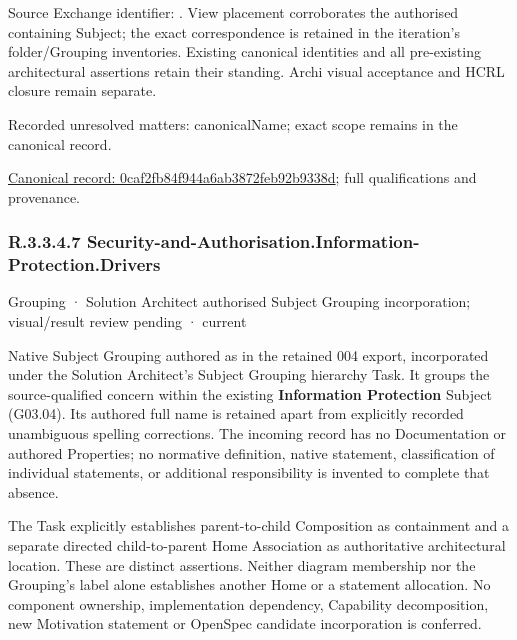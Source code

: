 Source Exchange identifier: \texttt{}. View placement corroborates
the authorised containing Subject; the exact correspondence is retained in the
iteration's folder/Grouping inventories. Existing canonical identities and all
pre-existing architectural assertions retain their standing. Archi visual
acceptance and HCRL closure remain separate.


{\small Recorded unresolved matters: canonicalName; exact scope remains in the canonical record.}\par
{\footnotesize \href{../../../../continuum/grouping/0caf2fb84f944a6ab3872feb92b9338d.md}{Canonical record: 0caf2fb84f944a6ab3872feb92b9338d}; full qualifications and provenance.}\par
\subsubsection*{R.3.3.4.7 Security-and-Authorisation.Information-Protection.Drivers}
\label{navigation:R.3.3.4.7}

\label{element:ce45a338a1fc4d11a8d64ce898119f94}
{\small Grouping · Solution Architect authorised Subject Grouping incorporation; visual/result review pending · current}\par

Native Subject Grouping authored as \texttt{} in the retained 004 export,
incorporated under the Solution Architect's Subject Grouping hierarchy Task.
It groups the source-qualified \texttt{} concern within
the existing \textbf{Information Protection} Subject (G03.04). Its authored full name
is retained apart from explicitly recorded unambiguous spelling corrections.
The incoming record has no Documentation or authored Properties; no normative
definition, native statement, classification of individual statements, or
additional responsibility is invented to complete that absence.



The Task explicitly establishes parent-to-child Composition as containment and
a separate directed child-to-parent Home Association as authoritative architectural
location. These are distinct assertions. Neither diagram membership nor the
Grouping's label alone establishes another Home or a statement allocation.
No component ownership, implementation dependency, Capability decomposition,
new Motivation statement or OpenSpec candidate incorporation is conferred.



